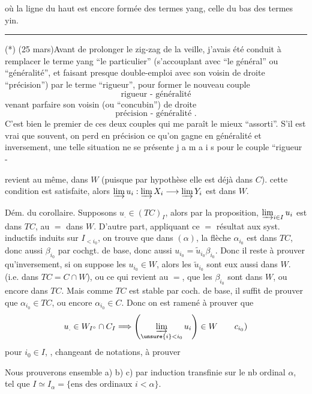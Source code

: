 {où la ligne du haut est encore formée des termes yang, celle du bas des termes yin.

\noindent\rule{2.1cm}{0.4pt}

(*) (25 mars)\quad Avant de prolonger le zig-zag de la veille, j'avais été conduit à remplacer le terme yang ``le particulier'' (s'accouplant avec ``le général'' ou ``généralité'', et faisant presque double-emploi avec son voisin de droite ``précision'') par le terme ``rigueur'', pour former le nouveau couple
\[
 \text{rigueur - généralité}
\]
venant parfaire son voisin (ou ``concubin'') de droite
\[
 \text{précision - généralité .}
\]
C'est bien le premier de ces deux couples qui me paraît le mieux ``assorti''. S'il est vrai que souvent, on perd en précision ce qu'on gagne en généralité et inversement, une telle situation ne se présente j a m a i s pour le couple ``rigueur -}

revient au même, dans $W$ (puisque par hypothèse elle est déjà dans $C$).  cette condition est satisfaite, alors $\varinjlim u_i:\varinjlim X_i\longrightarrow\varinjlim Y_i$ est dans $W$.

Dém. du corollaire. Supposons $u_.\in(TC)_I$, alors par la proposition, $\varinjlim_{i\in I}u_i$ est dans $TC$,   au $=$ dans $W$. D'autre part, appliquant ce $=$ résultat aux syst. inductifs induits sur $I_{<i_0}$, on trouve que dans $(\alpha)$, la \deleted{\unsure{$\beta$}} flèche  $\alpha_{i_0}$ est dans $TC$, donc aussi $\beta_{i_0}$ par cochgt. de base, donc aussi $u_{i_0}=\widetilde{u}_{i_0}\beta_{i_0}$.  Donc il reste à prouver qu'inversement, si on suppose les $u_{i_0}\in W$, alors les $\widetilde{u}_{i_0}$ sont eux aussi dans $W$. (i.e. dans $TC=C\cap W$), ou ce qui revient au $=$, que les $\beta_{i_0}$ sont dans $W$, ou encore dans $TC$. Mais comme $TC$ est stable par coch. de base, il suffit  de prouver que $\alpha_{i_0}\in TC$, ou encore $\alpha_{i_0}\in C$. Donc on est ramené à prouver que 
\[
 u_.\in W_{I^\circ}\cap C_I\Longrightarrow \left(\varinjlim_{\unsure{i}<i_0}u_i\right)\in W \tag*{$c_{i_0})$}
\]
pour  $i_0\in I$, , changeant de notations, à prouver

Nous prouverons ensemble a) b) c) par induction transfinie sur le nb ordinal $\alpha$, tel que $I\simeq I_\alpha=\{\text{ens des ordinaux }i<\alpha\}$.

